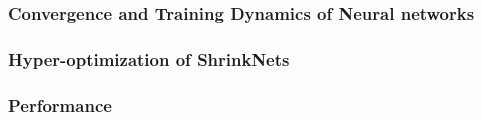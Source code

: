 \documentclass{article}
\begin{document}
\subsubsection{Convergence and Training Dynamics of Neural networks}
\subsubsection{Hyper-optimization of ShrinkNets}
\subsubsection{Performance}


\nocite{OpenML2013}



\end{document}
